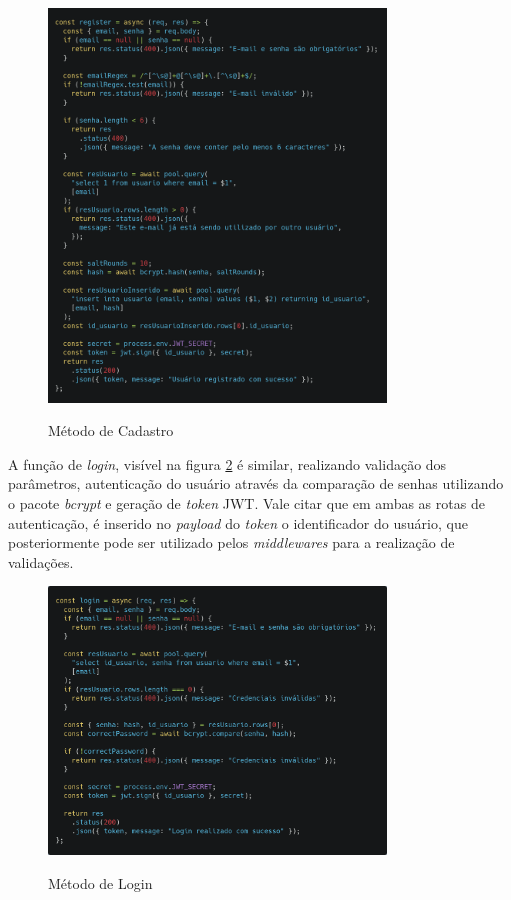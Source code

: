 \begin{figure}[!htb]
	\centering
	\caption{Método de Cadastro}
	\includegraphics[width=0.8\textwidth]{./dados/figuras/register}
	\label{fig:metodoCadastro}
\end{figure}
\pagebreak

A função de \textit{login}, visível na figura \ref{fig:metodoLogin} é similar, realizando validação dos parâmetros, autenticação do usuário através da comparação de senhas utilizando o pacote \textit{bcrypt} e geração de \textit{token} JWT. Vale citar que em ambas as rotas de autenticação, é inserido no \textit{payload} do \textit{token} o identificador do usuário, que posteriormente pode ser utilizado pelos \textit{middlewares} para a realização de validações.

\begin{figure}[!htb]
	\centering
	\caption{Método de Login}
	\includegraphics[width=0.8\textwidth]{./dados/figuras/login}
	\label{fig:metodoLogin}
\end{figure}
\pagebreak

